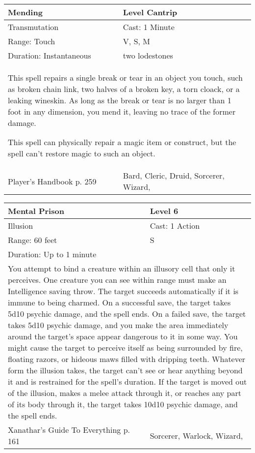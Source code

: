 \documentclass[11pt]{report}
\begin{document}
\begin{table}[H]
	\begin{tabular}{||p{6cm}|p{6cm}||}
		\hline\hline
		\bf{Mending} & Level Cantrip\\ \hline
		Transmutation & Cast: 1 Minute\\ \hline
		Range: Touch & V, S, M\\ \hline
		Duration: Instantaneous & two lodestones\\ \hline
		\multicolumn{2}{||p{12cm}||}{This spell repairs a single break or tear in an object you touch, such as broken chain link, two halves of a broken key, a torn cloack, or a leaking wineskin.
As long as the break or tear is no larger than 1 foot in any dimension, you mend it, leaving no trace of the former damage.

This spell can physically repair a magic item or construct, but the spell can’t restore magic to such an object.}\\ \hline
Player's Handbook p. 259 & Bard, Cleric, Druid, Sorcerer, Wizard, \\ \hline\hline
	\end{tabular}
\end{table}

\begin{table}[H]
	\begin{tabular}{||p{6cm}|p{6cm}||}
		\hline\hline
		\bf{Mental Prison} & Level 6\\ \hline
		Illusion & Cast: 1 Action\\ \hline
		Range: 60 feet & S\\ \hline
		Duration: Up to 1 minute & \\ \hline
		\multicolumn{2}{||p{12cm}||}{You attempt to bind a creature within an illusory cell that only it perceives. One creature you can see within range must make an Intelligence saving throw. The target succeeds automatically if it is immune to being charmed. On a successful save, the target takes 5d10 psychic damage, and the spell ends. On a failed save, the target takes 5d10 psychic damage, and you make the area immediately around the target’s space appear dangerous to it in some way. You might cause the target to perceive itself as being surrounded by fire, floating razors, or hideous maws filled with dripping teeth. Whatever form the illusion takes, the target can’t see or hear anything beyond it and is restrained for the spell’s duration. If the target is moved out of the illusion, makes a melee attack through it, or reaches any part of its body through it, the target takes 10d10 psychic damage, and the spell ends.}\\ \hline
Xanathar's Guide To Everything p. 161 & Sorcerer, Warlock, Wizard, \\ \hline\hline
	\end{tabular}
\end{table}
\end{document}
